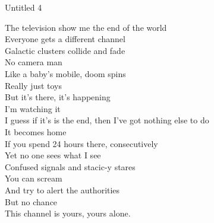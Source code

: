 Untitled 4

The television show me the end of the world\\
Everyone gets a different channel\\
Galactic clusters collide and fade\\
No camera man\\
Like a baby's mobile, doom spins\\
Really just toys\\
But it's there, it's happening\\
I'm watching it\\
I guess if it's is the end, then I've got nothing else to do\\
It becomes home\\
If you spend 24 hours there, consecutively\\
Yet no one sees what I see\\
Confused signals and stacic-y stares\\
You can scream\\
And try to alert the authorities\\
But no chance\\
This channel is yours, yours alone.\\


